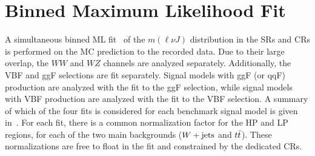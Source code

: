 %
\section{Binned Maximum Likelihood Fit}
\label{ch:stats:ml}
A simultaneous binned ML fit~\cite{lh_stats} of the $m(\ell\nu J)$ distribution in the SRs and CRs is performed on the MC prediction to the recorded data. Due to their large overlap, the $WW$ and $WZ$ channels are analyzed separately. Additionally, the VBF and ggF selections are fit separately. Signal models with ggF (or qqF) production are analyzed with the fit to the ggF selection, while signal models with VBF production are analyzed with the fit to the VBF selection. A summary of which of the four fits is considered for each benchmark signal model is given in~\Tab{\ref{tab:sig_fits}}. For each fit, there is a common normalization factor for the HP and LP regions, for each of the two main backgrounds ($W+\textrm{jets}$ and $t\bar{t}$). These normalizations are free to float in the fit and constrained by the dedicated CRs.

\begin{table}[b!]
\bigskip
\centering
{}
\caption[Selection regions used in the simultaneous maximum likelihood fit for the benchmark signal models]{Summary of the selection regions included in the maximum likelihood fit for each benchmark signal model. For each selection, all of the corresponding high purity (HP) and low purity (LP) signal regions (SR) and control regions (CR) are included. For example, in the fit corresponding to the ggF selection, $WW$ channel, the following regions are included in the simultaneous fit: HP SR ($WW$), LP SR ($WW$), HP \Wjets CR, LP \Wjets CR, HP \ttbar CR and LP \ttbar CR, with all regions passing the ggF selection.}
\label{tab:sig_fits}
\end{table}

